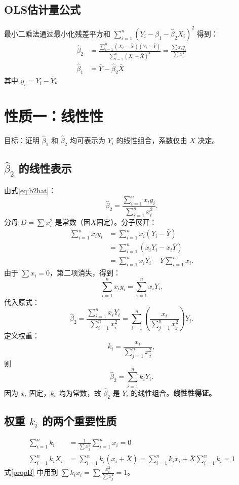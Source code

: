 \documentclass[12pt]{article}
\begin{document}
\subsection{OLS估计量公式}
最小二乘法通过最小化残差平方和 $\sum_{i=1}^n (Y_i - \hat{\beta}_1 - \hat{\beta}_2 X_i)^2$ 得到：
\begin{align}
    \hat{\beta}_2 &= \frac{\sum_{i=1}^n (X_i - \bar{X})(Y_i - \bar{Y})}{\sum_{i=1}^n (X_i - \bar{X})^2} = \frac{\sum x_i y_i}{\sum x_i^2}\label{eq:b2hat}\\
    \hat{\beta}_1 &= \bar{Y} - \hat{\beta}_2 \bar{X}\label{eq:b1hat}
\end{align}
其中 $y_i = Y_i - \bar{Y}$。

\section{性质一：线性性}
目标：证明 $\hat{\beta}_1$ 和 $\hat{\beta}_2$ 均可表示为 $Y_i$ 的线性组合，系数仅由 $X$ 决定。

\subsection{$\hat{\beta}_2$ 的线性表示}
由式\eqref{eq:b2hat}：
\[
\hat{\beta}_2 = \frac{\sum_{i=1}^n x_i y_i}{\sum_{i=1}^n x_i^2}.
\]
分母 $D = \sum x_i^2$ 是常数（因$X$固定）。分子展开：
\begin{align*}
\sum_{i=1}^n x_i y_i &= \sum_{i=1}^n x_i (Y_i - \bar{Y}) \\
&= \sum_{i=1}^n (x_i Y_i - x_i \bar{Y}) \\
&= \sum_{i=1}^n x_i Y_i - \bar{Y} \sum_{i=1}^n x_i.
\end{align*}
由于 $\sum x_i = 0$，第二项消失，得到：
\[
\sum_{i=1}^n x_i y_i = \sum_{i=1}^n x_i Y_i.
\]
代入原式：
\[
\hat{\beta}_2 = \frac{\sum_{i=1}^n x_i Y_i}{\sum_{i=1}^n x_i^2} = \sum_{i=1}^n \left( \frac{x_i}{\sum_{j=1}^n x_j^2} \right) Y_i.
\]
定义权重：
\[
k_i = \frac{x_i}{\sum_{j=1}^n x_j^2},
\]
则
\[
\hat{\beta}_2 = \sum_{i=1}^n k_i Y_i.
\]
因为 $x_i$ 固定，$k_i$ 均为常数，故 $\hat{\beta}_2$ 是 $Y_i$ 的线性组合。\textbf{线性性得证。}

\subsection{权重 $k_i$ 的两个重要性质}
\begin{align}
\sum_{i=1}^n k_i &= \frac{1}{\sum x_j^2}\sum_{i=1}^n x_i = 0 \label{propA}\\
\sum_{i=1}^n k_i X_i &= \sum_{i=1}^n k_i (x_i + \bar{X}) = \sum_{i=1}^n k_i x_i + \bar{X}\sum_{i=1}^n k_i = 1 \label{propB}
\end{align}
式\eqref{propB} 中用到 $\sum k_i x_i = \sum \frac{x_i^2}{\sum x_j^2} = 1$。
\end{document}
